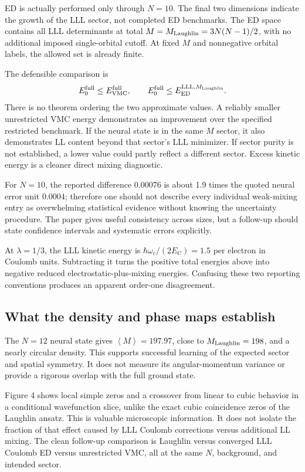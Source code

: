 \documentclass[11pt,letterpaper]{article}
\newcommand{\EC}{E_{\mathrm C}}
\newcommand{\LLL}{\mathrm{LLL}}
\newcommand{\avg}[1]{\left\langle #1\right\rangle}
\begin{document}
ED is actually performed only through $N=10$. The final two dimensions indicate the growth of the LLL sector, not completed ED benchmarks. The ED space contains all LLL determinants at total $M=M_{\rm Laughlin}=3N(N-1)/2$, with no additional imposed single-orbital cutoff. At fixed $M$ and nonnegative orbital labels, the allowed set is already finite.

The defensible comparison is
\begin{equation}
 E_0^{\rm full}\le E_{\rm VMC}^{\rm full},\qquad
 E_0^{\rm full}\le E_{\rm ED}^{\LLL,M_{\rm Laughlin}}.
\end{equation}
There is no theorem ordering the two approximate values. A reliably smaller unrestricted VMC energy demonstrates an improvement over the specified restricted benchmark. If the neural state is in the same $M$ sector, it also demonstrates LL content beyond that sector's LLL minimizer. If sector purity is not established, a lower value could partly reflect a different sector. Excess kinetic energy is a cleaner direct mixing diagnostic.

For $N=10$, the reported difference $0.00076$ is about 1.9 times the quoted neural error unit $0.0004$; therefore one should not describe every individual weak-mixing entry as overwhelming statistical evidence without knowing the uncertainty procedure. The paper gives useful consistency across sizes, but a follow-up should state confidence intervals and systematic errors explicitly.

At $\lambda=1/3$, the LLL kinetic energy is $\hbar\omega_c/(2\EC)=1.5$ per electron in Coulomb units. Subtracting it turns the positive total energies above into negative reduced electrostatic-plus-mixing energies. Confusing these two reporting conventions produces an apparent order-one disagreement.

\subsection{What the density and phase maps establish}

The $N=12$ neural state gives $\avg M=197.97$, close to $M_{\rm Laughlin}=198$, and a nearly circular density. This supports successful learning of the expected sector and spatial symmetry. It does not measure its angular-momentum variance or provide a rigorous overlap with the full ground state.

Figure 4 shows local simple zeros and a crossover from linear to cubic behavior in a conditional wavefunction slice, unlike the exact cubic coincidence zeros of the Laughlin ansatz. This is valuable microscopic information. It does not isolate the fraction of that effect caused by LLL Coulomb corrections versus additional LL mixing. The clean follow-up comparison is Laughlin versus converged LLL Coulomb ED versus unrestricted VMC, all at the same $N$, background, and intended sector.
\end{document}
